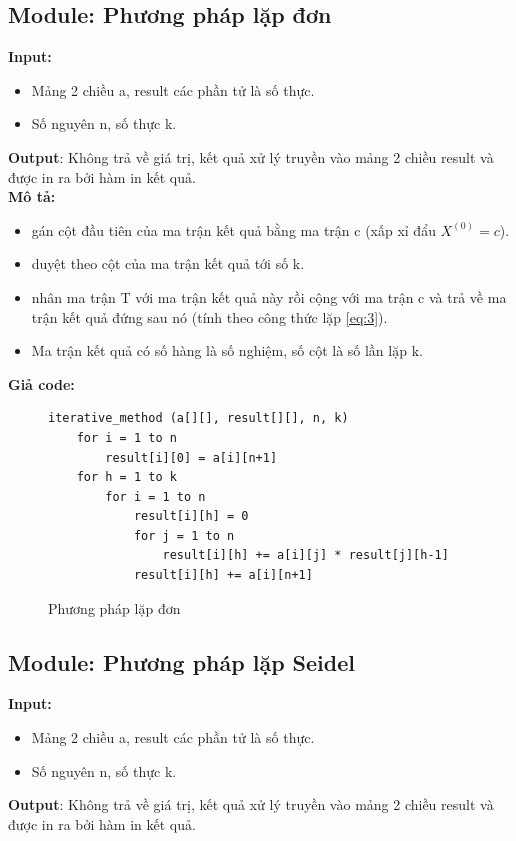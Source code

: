 \documentclass[twoside]{report2}
\begin{document}
\subsection{Module: Phương pháp lặp đơn}

\textbf{Input:}
\begin{itemize}
\item Mảng 2 chiều a, result các phần tử là số thực.
\item Số nguyên n, số thực k.
\end{itemize}
\textbf{Output}: Không trả về giá trị, kết quả xử lý truyền vào mảng 2 chiều result và được in ra bởi hàm in kết quả.\\

\textbf{Mô tả:}
\begin{itemize}
\item gán cột đầu tiên của ma trận kết quả bằng ma trận c (xấp xỉ đẩu $X^{(0)} = c$).
\item duyệt theo cột của ma trận kết quả tới số k.
\item nhân ma trận T với ma trận kết quả này rồi cộng với ma trận c và trả về ma trận kết quả đứng sau nó (tính theo công thức lặp \ref{eq:3}).
\item Ma trận kết quả có số hàng là số nghiệm, số cột là số lần lặp k.
\end{itemize}

\textbf{Giả code:}
\begin{figure}[!h]\label{fig:ldon}
\begin{lstlisting}[frame=single]
iterative_method (a[][], result[][], n, k)
    for i = 1 to n
        result[i][0] = a[i][n+1]
    for h = 1 to k
        for i = 1 to n
            result[i][h] = 0
            for j = 1 to n
                result[i][h] += a[i][j] * result[j][h-1]
            result[i][h] += a[i][n+1]
\end{lstlisting}
\caption{Phương pháp lặp đơn}
\end{figure}
\newpage
\subsection{Module: Phương pháp lặp Seidel}
\textbf{Input:}
\begin{itemize}
\item Mảng 2 chiều a, result các phần tử là số thực.
\item Số nguyên n, số thực k.
\end{itemize}
\textbf{Output}: Không trả về giá trị, kết quả xử lý truyền vào mảng 2 chiều result và được in ra bởi hàm in kết quả.\\
\end{document}
